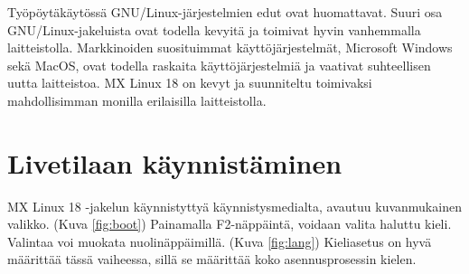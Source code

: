 \documentclass[a4paper, 12pt, finnish]{article}
\begin{document}
Työpöytäkäytössä GNU/Linux-järjestelmien edut ovat huomattavat. Suuri osa GNU/Linux-jakeluista ovat todella kevyitä ja toimivat hyvin vanhemmalla laitteistolla. Markkinoiden suosituimmat käyttöjärjestelmät, Microsoft Windows sekä MacOS, ovat todella raskaita käyttöjärjestelmiä ja vaativat suhteellisen uutta laitteistoa. MX Linux 18 on kevyt ja suunniteltu toimivaksi mahdollisimman monilla erilaisilla laitteistolla.

\section{Livetilaan käynnistäminen}
MX Linux 18 -jakelun käynnistyttyä käynnistysmedialta, avautuu kuvanmukainen valikko. (Kuva \ref{fig:boot})
Painamalla F2-näppäintä, voidaan valita haluttu kieli. Valintaa voi muokata nuolinäppäimillä. (Kuva \ref{fig:lang}) Kieliasetus on hyvä määrittää tässä vaiheessa, sillä se määrittää koko asennusprosessin kielen.
\end{document}
